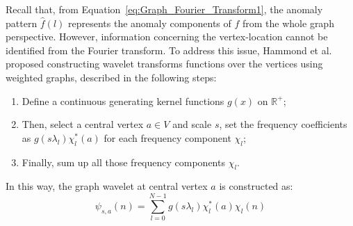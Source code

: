
Recall that, from Equation~\ref{eq:Graph_Fourier_Transform1}, the anomaly pattern $\hat{f}(l)$ represents the anomaly components of $f$ from the whole graph perspective. However, information concerning the vertex-location cannot be identified from the Fourier transform. To address this issue, Hammond et al.~\cite{hammond2011wavelets} proposed constructing wavelet transforms functions over the vertices using weighted graphs, described in the following steps:

\begin{enumerate}
\item Define a continuous generating kernel functions $g(x)$ on $\mathbb{R}^+$;
\item Then, select a central vertex $a \in {V}$ and scale $s$, set the frequency coefficients as $g(s\lambda_l)\chi^*_l(a)$ for each frequency component $\chi_l$;
\item Finally, sum up all those frequency components $\chi_l$.
\end{enumerate}
In this way, the graph wavelet at central vertex $a$ is constructed as:
\begin{equation}
\label{eq:graphwaveletdefinition}
\psi_{s,a}(n) = \sum\limits_{l=0}^{N-1}g(s\lambda_l)\chi_l^*(a)\chi_l(n)
\end{equation}


